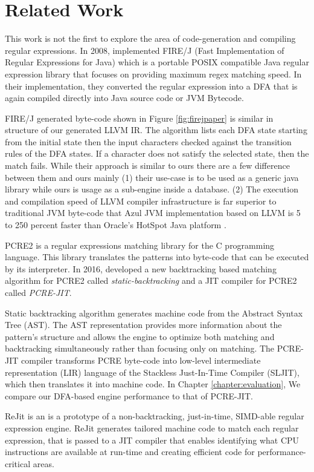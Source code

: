 \chapter{Related Work}\label{chapter:related_work}
This work is not the first to explore the area of code-generation and  compiling regular expressions. In 2008, \citet{firejpaper} implemented FIRE/J (Fast Implementation of Regular Expressions for Java) which is a portable POSIX compatible Java regular expression library that focuses on providing maximum regex matching speed. In their implementation, they converted the regular expression into a DFA that is again compiled directly into Java source code or JVM Bytecode.

\noindent FIRE/J generated byte-code shown in Figure \ref{fig:firejpaper} is similar in structure of our generated LLVM IR. The algorithm lists each DFA state starting from the initial state then the input characters checked against the transition rules of the DFA states. If a character does not satisfy the selected state, then the match fails. While their approach is similar to ours there are a few difference between them and ours mainly (1) their use-case is to be used as a generic java library while ours is usage as a sub-engine inside a database. (2) The execution and compilation speed of LLVM compiler infrastructure is far superior to traditional JVM byte-code that Azul JVM implementation based on LLVM is 5 to 250 percent faster than Oracle's HotSpot Java platform \cite{azul}.

PCRE2 is a regular expressions matching library for the C programming language. This library translates the patterns into byte-code that can be executed by its interpreter.  In 2016, \citet{pcre2_jit} developed a new backtracking based matching algorithm for PCRE2 called \textit{static-backtracking} and a JIT compiler for PCRE2 called \textit{PCRE-JIT}.

Static backtracking algorithm generates machine code from the Abstract Syntax Tree (AST). The AST representation provides more information about the pattern's structure and allows the engine to optimize both matching and backtracking simultaneously rather than focusing only on matching. The PCRE-JIT compiler transforms PCRE byte-code into low-level intermediate representation (LIR) language of the Stackless Just-In-Time Compiler (SLJIT), which then translates it into machine code. In Chapter \ref{chapter:evaluation}, We compare our DFA-based engine performance to that of PCRE-JIT.

ReJit \cite{rejit} is an is a prototype of a non-backtracking, just-in-time, SIMD-able regular expression engine. ReJit generates tailored machine code to match each regular expression, that is passed to a JIT compiler that enables identifying what CPU instructions are available at run-time and creating efficient code for performance-critical areas.


